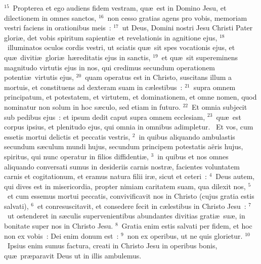 ${}^{15}$~Propterea et ego audiens fidem vestram, qu\ae\ est in Domino Jesu, et dilectionem in omnes sanctos,
${}^{16}$~non cesso gratias agens pro vobis, memoriam vestri faciens in orationibus meis~:
${}^{17}$~ut Deus, Domini nostri Jesu Christi Pater glori\ae , det vobis spiritum sapienti\ae\ et revelationis in agnitione ejus,
${}^{18}$~illuminatos oculos cordis vestri, ut sciatis qu\ae\ sit spes vocationis ejus, et qu\ae\ diviti\ae\ glori\ae\ h\ae reditatis ejus in sanctis,
${}^{19}$~et qu\ae\ sit supereminens magnitudo virtutis ejus in nos, qui credimus secundum operationem potenti\ae\ virtutis ejus,
${}^{20}$~quam operatus est in Christo, suscitans illum a mortuis, et constituens ad dexteram suam in c\ae lestibus~:
${}^{21}$~supra omnem principatum, et potestatem, et virtutem, et dominationem, et omne nomen, quod nominatur non solum in hoc s\ae culo, sed etiam in futuro.
${}^{22}$~Et omnia subjecit sub pedibus ejus~: et ipsum dedit caput supra omnem ecclesiam,
${}^{23}$~qu\ae\ est corpus ipsius, et plenitudo ejus, qui omnia in omnibus adimpletur.
~\lettrine[lines=10,image=true,loversize=0.05,lraise=-0.03]{E}{}t vos, cum essetis mortui delictis et peccatis vestris,
${}^{2}$~in quibus aliquando ambulastis secundum s\ae culum mundi hujus, secundum principem potestatis a\"eris hujus, spiritus, qui nunc operatur in filios diffidenti\ae ,
${}^{3}$~in quibus et nos omnes aliquando conversati sumus in desideriis carnis nostr\ae , facientes voluntatem carnis et cogitationum, et eramus natura filii ir\ae , sicut et ceteri~:
${}^{4}$~Deus autem, qui dives est in misericordia, propter nimiam caritatem suam, qua dilexit nos,
${}^{5}$~et cum essemus mortui peccatis, convivificavit nos in Christo (cujus gratia estis salvati),
${}^{6}$~et conresuscitavit, et consedere fecit in c\ae lestibus in Christo Jesu~:
${}^{7}$~ut ostenderet in s\ae culis supervenientibus abundantes divitias grati\ae\ su\ae , in bonitate super nos in Christo Jesu.
${}^{8}$~Gratia enim estis salvati per fidem, et hoc non ex vobis~: Dei enim donum est~:
${}^{9}$~non ex operibus, ut ne quis glorietur.
${}^{10}$~Ipsius enim sumus factura, creati in Christo Jesu in operibus bonis, qu\ae\ pr\ae paravit Deus ut in illis ambulemus.


